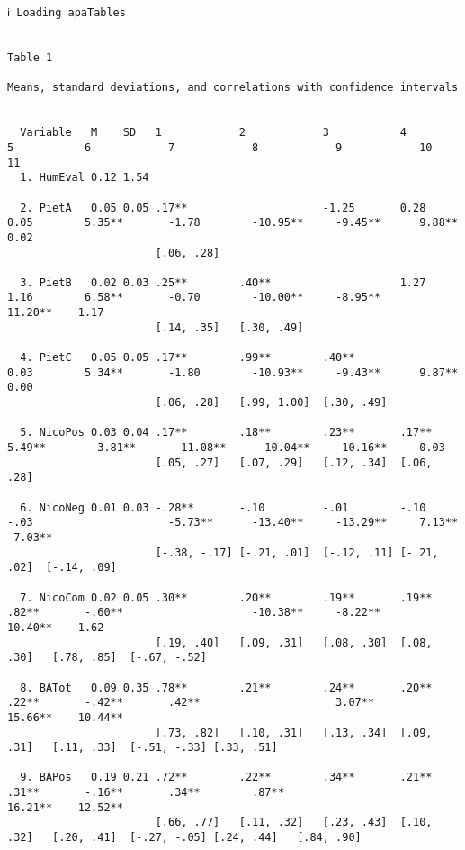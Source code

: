 \documentclass[a4paper,10pt,onecolumn,oneside,openright]{article}
\begin{document}
\begin{verbatim}
ℹ Loading apaTables


Table 1

Means, standard deviations, and correlations with confidence intervals


  Variable   M    SD   1            2            3           4            5           6            7            8            9            10         11
  1. HumEval 0.12 1.54

  2. PietA   0.05 0.05 .17**                     -1.25       0.28         0.05        5.35**       -1.78        -10.95**     -9.45**      9.88**     0.02
                       [.06, .28]

  3. PietB   0.02 0.03 .25**        .40**                    1.27         1.16        6.58**       -0.70        -10.00**     -8.95**      11.20**    1.17
                       [.14, .35]   [.30, .49]

  4. PietC   0.05 0.05 .17**        .99**        .40**                    0.03        5.34**       -1.80        -10.93**     -9.43**      9.87**     0.00
                       [.06, .28]   [.99, 1.00]  [.30, .49]

  5. NicoPos 0.03 0.04 .17**        .18**        .23**       .17**                    5.49**       -3.81**      -11.08**     -10.04**     10.16**    -0.03
                       [.05, .27]   [.07, .29]   [.12, .34]  [.06, .28]

  6. NicoNeg 0.01 0.03 -.28**       -.10         -.01        -.10         -.03                     -5.73**      -13.40**     -13.29**     7.13**     -7.03**
                       [-.38, -.17] [-.21, .01]  [-.12, .11] [-.21, .02]  [-.14, .09]

  7. NicoCom 0.02 0.05 .30**        .20**        .19**       .19**        .82**       -.60**                    -10.38**     -8.22**      10.40**    1.62
                       [.19, .40]   [.09, .31]   [.08, .30]  [.08, .30]   [.78, .85]  [-.67, -.52]

  8. BATot   0.09 0.35 .78**        .21**        .24**       .20**        .22**       -.42**       .42**                     3.07**       15.66**    10.44**
                       [.73, .82]   [.10, .31]   [.13, .34]  [.09, .31]   [.11, .33]  [-.51, -.33] [.33, .51]

  9. BAPos   0.19 0.21 .72**        .22**        .34**       .21**        .31**       -.16**       .34**        .87**                     16.21**    12.52**
                       [.66, .77]   [.11, .32]   [.23, .43]  [.10, .32]   [.20, .41]  [-.27, -.05] [.24, .44]   [.84, .90]


\end{verbatim}
\end{document}
